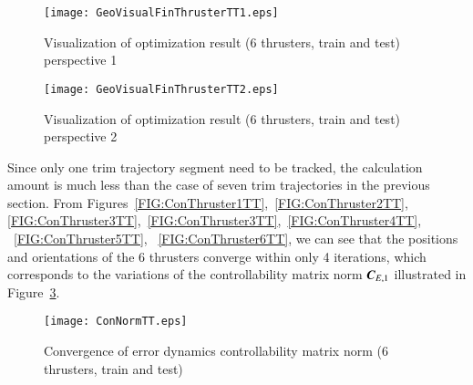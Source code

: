 \begin{figure}[h]
\center
\texttt{[image: GeoVisualFinThrusterTT1.eps]}
\caption{Visualization of optimization result (6 thrusters, train and test) perspective 1}	
\label{FIG:GeoVisualFinThrusterTT1}
\end{figure}
\begin{figure}[h]
\texttt{[image: GeoVisualFinThrusterTT2.eps]}
\caption{Visualization of optimization result (6 thrusters, train and test) perspective 2}	
\label{FIG:GeoVisualFinThrusterTT2}
\end{figure}
\newpage  
Since only one trim trajectory segment need to be tracked, the calculation amount is much less than the case of seven trim trajectories in the previous section. From Figures~\ref{FIG:ConThruster1TT},~\ref{FIG:ConThruster2TT}, \ref{FIG:ConThruster3TT},~\ref{FIG:ConThruster3TT},~\ref{FIG:ConThruster4TT},
~\ref{FIG:ConThruster5TT}, ~\ref{FIG:ConThruster6TT}, we can see that the positions and orientations of the 6 thrusters converge within only 4 iterations, which corresponds to the variations of the controllability matrix norm $\emph{\textbf{C}}_{E,1}$ illustrated in Figure~\ref{FIG:ConNormTT}.
\begin{figure}[h]
\centering
\texttt{[image: ConNormTT.eps]}
\caption{Convergence of error dynamics controllability matrix norm (6 thrusters, train and test)}	
\label{FIG:ConNormTT}
\end{figure}

